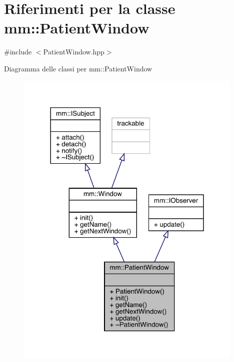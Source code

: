 \hypertarget{classmm_1_1_patient_window}{}\section{Riferimenti per la classe mm\+:\+:Patient\+Window}
\label{classmm_1_1_patient_window}


{\ttfamily \#include $<$Patient\+Window.\+hpp$>$}



Diagramma delle classi per mm\+:\+:Patient\+Window\nopagebreak
\begin{figure}[H]
\begin{center}
\leavevmode
\includegraphics[width=309pt]{d9/d55/classmm_1_1_patient_window__inherit__graph}
\end{center}
\end{figure}


